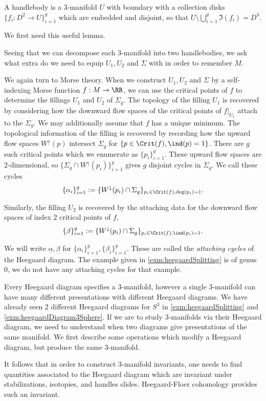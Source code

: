 


A handlebody is a 3-manifold $U$ with boundary with a collection disks $\{f_i: D^2\to U\}_{i=1}^g$ which are embedded and disjoint, so that $U\setminus \bigcup_{i=1}^g \Im(f_i)=D^3$. 


We first need this useful lemma.


Seeing that we can decompose each 3-manifold into two handlebodies, we ask what extra do we need to equip  $U_1, U_2$ and $\Sigma$ with in order to remember $M$. 

We again turn to Morse theory. When we construct $U_1, U_2$ and $\Sigma$ by a self-indexing Morse function $f: M\to \RR$, we can use the critical points of $f$ to determine the fillings $U_1$ and $U_2$ of $\Sigma_g$. The topology of the filling $U_1$ is recovered by considering how the downward flow spaces of the critical points of $f|_{U_1}$ attach to the $\Sigma_g$. We may additionally assume  that $f$ has a unique minimum. The topological information of the filling is recovered by recording how the upward flow spaces $W^\uparrow(p)$ intersect $\Sigma_g$ for $\{p\in \Crit(f), \ind(p)=1\}$. There are $g$ such critical points which we enumerate as $\{p_i\}_{i=1}^g$. These upward flow spaces are 2-dimensional, so $\{\Sigma_g\cap W^\uparrow(p_i)\}_{i=1}^g$ gives $g$ disjoint cycles in $\Sigma_g$. We call these cycles 
\[\{\alpha_i\}_{i=1}^g:=\{ W^\downarrow(p_i)\cap \Sigma_g\}_{p_i\in \Crit(f), \deg(p_i)=1}.\]

Similarly, the filling $U_2$ is recovered by the attaching data for the downward flow spaces of index 2 critical points of $f$,
\[\{\beta\}_{i=1}^g:=\{ W^\downarrow(p_i)\cap \Sigma_g\}_{p_i\in \Crit(f), \ind(p_i)=1}.\]

We will write  $\underline \alpha, \underline \beta$ for $\{\alpha_i\}_{i=1}^g, \{\beta_i\}_{i=1}^g$. These are called the \emph{attaching cycles} of the Heegaard diagram.
The example given in \cref{exm:heegaardSplitting} is of genus 0, we do not have any attaching cycles for that example.

Every Heegaard diagram specifies a 3-manifold, however a single 3-manifold can have many different presentations with different Heegaard diagrams. We have already seen 2 different Heegaard diagrams for $S^3$ in \cref{exm:heegaardSplitting} and  \cref{exm:heegaardDiagram3Sphere}. 
If we are to study 3-manifolds via their Heegaard diagram, we need to understand when two diagrams give presentations of the same manifold. We first describe some operations which modify a Heegaard diagram, but produce the same 3-manifold. 





It follows that in order to construct 3-manifold invariants, one needs to find  quantities associated to the Heegaard diagram which are invariant under stabilizations, isotopies, and handles slides. Heegaard-Floer cohomology provides such an invariant.